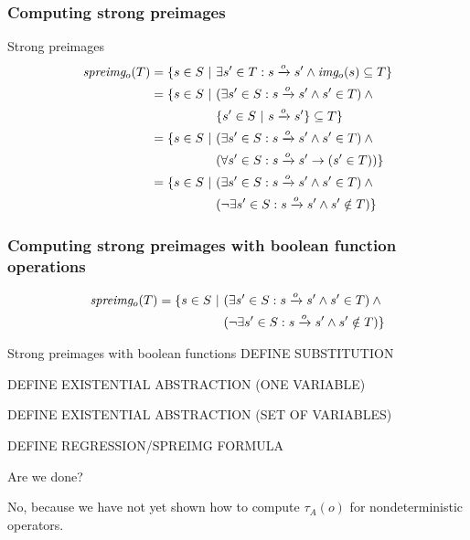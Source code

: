 \documentclass{gkibeamer}
\begin{document}
\begin{frame}
  \frametitle{Computing strong preimages}

  \begin{block}{Strong preimages}
    \begin{align*}
      \spreimage{o}{T}
      & = \{s \in S~|~\exists s' \in T: s \xrightarrow{o} s' \land \image{o}{s} \subseteq T\} \\
      & = \{s \in S~|~(\exists s' \in S:
      s \xrightarrow{o} s' \land s' \in T) \land {} \\
      & \phantom{= \{s' \in S~|~}
      \{s' \in S~|~s \xrightarrow{o} s'\} \subseteq T\} \\
      & = \{s \in S~|~(\exists s' \in S:
      s \xrightarrow{o} s' \land s' \in T) \land {} \\
      & \phantom{= \{s' \in S~|~}
      (\forall s' \in S: s \xrightarrow{o} s' \rightarrow (s' \in T)) \} \\
      & = \{s \in S~|~(\exists s' \in S:
      s \xrightarrow{o} s' \land s' \in T) \land {} \\
      & \phantom{= \{s' \in S~|~}
      (\neg \exists s' \in S: s \xrightarrow{o} s' \land s' \notin T) \}
    \end{align*}
  \end{block}
\end{frame}

\begin{frame}
  \frametitle{Computing strong preimages with boolean function operations}

  \begin{align*}
    \spreimage{o}{T} & = \{s \in S~|~(\exists s' \in S:
    s \xrightarrow{o} s' \land s' \in T) \land {} \\
    & \phantom{= \{s' \in S~|~}
    (\neg \exists s' \in S: s \xrightarrow{o} s' \land s' \notin T) \}
  \end{align*}

  \begin{block}{Strong preimages with boolean functions}
  DEFINE SUBSTITUTION

  DEFINE EXISTENTIAL ABSTRACTION (ONE VARIABLE)

  DEFINE EXISTENTIAL ABSTRACTION (SET OF VARIABLES)

  DEFINE REGRESSION/SPREIMG FORMULA
  \end{block}



  Are we done?
  
  No, because we have not yet shown how to compute $\tau_A(o)$
  for \alert{nondeterministic} operators.
\end{frame}
\end{document}
